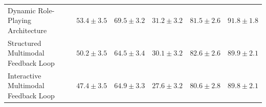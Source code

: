 \documentclass{article} %
\newcommand{\ouralgo}{Meta Agent Search\xspace}
\begin{document}
\begin{table}[h]
{\begin{tabular}{>{\raggedright}p{7cm}c|cccc}
        Dynamic Role-Playing Architecture & \rule{0pt}{2.2ex}$\mathbf{53.4 \pm 3.5}$ & $\mathbf{69.5 \pm 3.2}$ & $\mathbf{31.2 \pm 3.2}$ & $81.5 \pm 2.6$ & $\mathbf{91.8 \pm 1.8}$ \\
        Structured Multimodal Feedback Loop & \rule{0pt}{2.2ex}$50.2 \pm 3.5$ & $64.5 \pm 3.4$ & $30.1 \pm 3.2$ & $\mathbf{82.6 \pm 2.6}$ & $89.9 \pm 2.1$ \\
        Interactive Multimodal Feedback Loop & \rule{0pt}{2.2ex}$47.4 \pm 3.5$ & $64.9 \pm 3.3$ & $27.6 \pm 3.2$ & $80.6 \pm 2.8$ & $89.8 \pm 2.1$ \\
        \bottomrule
    \end{tabular}}
    \label{tab:transfer_dataset}
\end{table}

\begin{table}[h]
    \centering
    \caption{\textbf{Performance across multiple domains when transferring top agents from the Math (MGSM) domain to non-math domains.} Agents discovered by \ouralgo in the math domain can outperform or match the performance of baselines after being transferred to domains beyond math. We report the test accuracy and the 95\% bootstrap confidence interval.}
\end{table}
\end{document}
